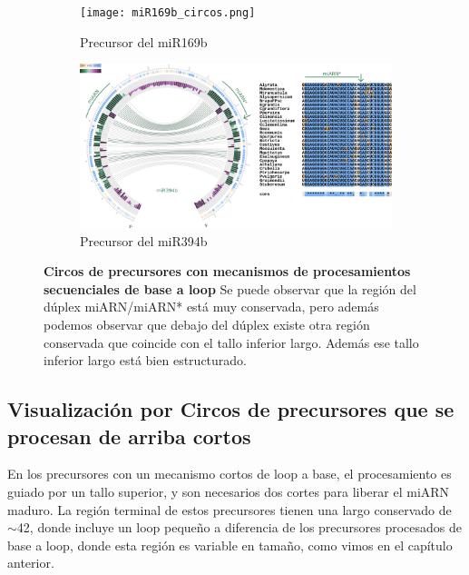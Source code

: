 \begin{landscape}
	\begin{figure}
	\centering
	\begin{subfigure}{.75\textwidth}
 \centering
 \texttt{[image: miR169b\_circos.png]}
 \caption{Precursor del miR169b}
 \label{subfig:miR169b_circos}
	\end{subfigure}%
	\begin{subfigure}{.75\textwidth}
 \centering
 \includegraphics[width=.9\linewidth]{miR394b_circos.png}
 \caption{Precursor del miR394b}
 \label{subfig:miR394b_circos}
	\end{subfigure}
    \caption[Circos de precursores con mecanismos de procesamientos secuenciales de base a loop]{
        \textbf{Circos de precursores con mecanismos de procesamientos secuenciales de base a loop}
        Se puede observar que la región del dúplex miARN/miARN* está muy conservada, pero además podemos observar que debajo del dúplex existe otra región conservada que coincide con el tallo inferior largo.
        Además ese tallo inferior largo está bien estructurado.
        }

	\label{fig:seqBTL_circos}
	\end{figure}
\end{landscape}


\subsection{Visualización por Circos de precursores que se procesan de arriba cortos}

En los precursores con un mecanismo cortos de loop a base, el procesamiento es guiado por un tallo superior, y son necesarios dos cortes para liberar el miARN maduro.
La región terminal de estos precursores tienen una largo conservado de $\sim$42, donde incluye un loop pequeño \citep{Bologna2013} a diferencia de los precursores procesados de base a loop, donde esta región es variable en tamaño, como vimos en el capítulo anterior.

